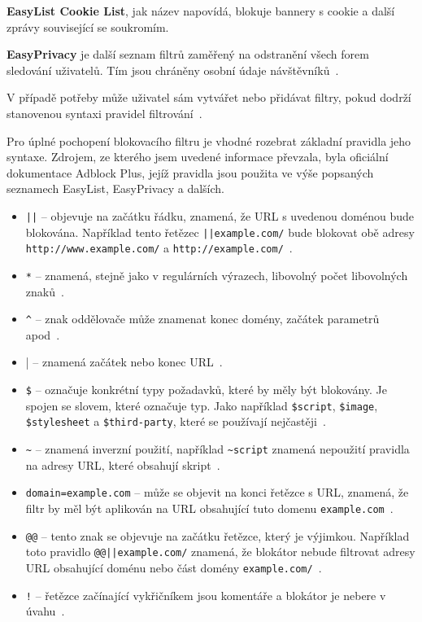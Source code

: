 \textbf{EasyList Cookie List}, jak název napovídá, blokuje bannery s cookie a další zprávy související se soukromím. 

\textbf{EasyPrivacy} je další seznam filtrů zaměřený na odstranění všech forem sledování uživatelů. Tím jsou chráněny osobní údaje návštěvníků~\cite{easylist}.

V případě potřeby může uživatel sám vytvářet nebo přidávat filtry, pokud dodrží stanovenou syntaxi pravidel filtrování~\cite{filterRule}.

Pro úplné pochopení blokovacího filtru je vhodné rozebrat základní pravidla jeho syntaxe. Zdrojem, ze kterého jsem uvedené informace převzala, byla oficiální dokumentace Adblock Plus, jejíž pravidla jsou použita ve výše popsaných seznamech EasyList, EasyPrivacy a dalších.

\begin{itemize}
    \item \texttt{||} -- objevuje na začátku řádku, znamená, že URL s uvedenou doménou bude blokována. Například tento řetězec \texttt{||example.com/} bude blokovat obě adresy \\
    \texttt{http://www.example.com/} a \texttt{http://example.com/}~\cite{filterRule}.
    \item \texttt{*} -- znamená, stejně jako v regulárních výrazech, libovolný počet libovolných znaků~\cite{filterRule}.
    \item \texttt{\^} -- znak oddělovače může znamenat konec domény, začátek parametrů apod~\cite{filterRule}.
    \item \verb||| -- znamená začátek nebo konec URL~\cite{filterRule}.
    \item \verb|$| -- označuje konkrétní typy požadavků, které by měly být blokovány. Je spojen se slovem, které označuje typ. Jako například \verb|$script|, \verb|$image|, \verb|$stylesheet| a \verb|$third-party|, které se používají nejčastěji~\cite{filterRule}.
    \item \verb|~| -- znamená inverzní použití, například \verb|~script| znamená nepoužití pravidla na adresy URL, které obsahují skript~\cite{filterRule}.
    \item \texttt{domain=example.com} -- může se objevit na konci řetězce s URL, znamená, že filtr by měl být aplikován na URL obsahující tuto domenu \texttt{example.com}~\cite{filterRule}.
    \item \texttt{@@} -- tento znak se objevuje na začátku řetězce, který je výjimkou. Například toto pravidlo \texttt{@@||example.com/} znamená, že blokátor nebude filtrovat adresy URL obsahující doménu nebo část domény \texttt{example.com/}~\cite{filterRule}.
    \item \texttt{!} -- řetězce začínající vykřičníkem jsou komentáře a blokátor je nebere v úvahu~\cite{filterRule}.
\end{itemize}

